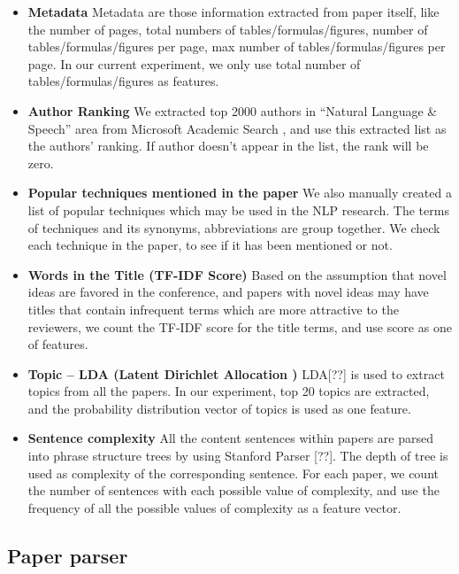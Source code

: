 \documentclass[11pt,letterpaper]{article}
\begin{document}
\begin{itemize} 
\item {\bf Metadata}
Metadata are those information extracted from paper itself, like the number of pages, total numbers of tables/formulas/figures, number of tables/formulas/figures per page, max number of tables/formulas/figures per page. In our current experiment, we only use total number of tables/formulas/figures as features.

\item {\bf 	Author Ranking}
We extracted top 2000 authors in ``Natural Language \& Speech'' area from Microsoft Academic Search , and use this extracted list as the authors’ ranking. If author doesn’t appear in the list, the rank will be zero.

\item {\bf 	Popular techniques mentioned in the paper}
We also manually created a list of popular techniques which may be used in the NLP research. The terms of techniques and its synonyms, abbreviations are group together. We check each technique in the paper, to see if it has been mentioned or not.

\item {\bf Words in the Title (TF-IDF Score)}
Based on the assumption that novel ideas are favored in the conference, and papers with novel ideas may have titles that contain infrequent terms which are more attractive to the reviewers, we count the TF-IDF score for the title terms, and use score as one of features.

\item {\bf Topic – LDA (Latent Dirichlet Allocation )}
LDA[??] is used to extract topics from all the papers. In our experiment, top 20 topics are extracted, and the probability distribution vector of topics is used as one feature. 

\item {\bf 	Sentence complexity}
All the content sentences within papers are parsed into phrase structure trees by using Stanford Parser [??]. The depth of tree is used as complexity of the corresponding sentence.  
For each paper, we count the number of sentences with each possible value of complexity,
and use the frequency of all the possible values of complexity as a feature vector.
\end{itemize}




\subsection{Paper parser}
\end{document}
